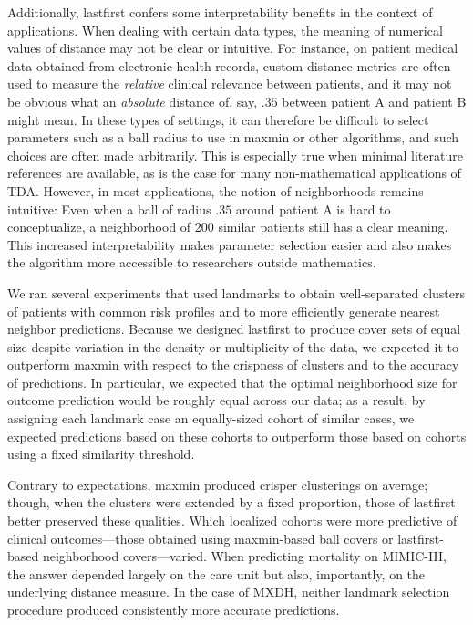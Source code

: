 \documentclass{article}
\begin{document}
Additionally, lastfirst confers some interpretability benefits in the
context of applications. When dealing with certain data types, the
meaning of numerical values of distance may not be clear or intuitive.
For instance, on patient medical data obtained from electronic health
records, custom distance metrics are often used to measure the
\emph{relative} clinical relevance between patients, and it may not be
obvious what an \emph{absolute} distance of, say, \(.35\) between
patient A and patient B might mean. In these types of settings, it can
therefore be difficult to select parameters such as a ball radius to use
in maxmin or other algorithms, and such choices are often made
arbitrarily. This is especially true when minimal literature references
are available, as is the case for many non-mathematical applications of
TDA. However, in most applications, the notion of neighborhoods remains
intuitive: Even when a ball of radius \(.35\) around patient A is hard
to conceptualize, a neighborhood of 200 similar patients still has a
clear meaning. This increased interpretability makes parameter selection
easier and also makes the algorithm more accessible to researchers
outside mathematics.

We ran several experiments that used landmarks to obtain well-separated
clusters of patients with common risk profiles and to more efficiently
generate nearest neighbor predictions. Because we designed lastfirst to
produce cover sets of equal size despite variation in the density or
multiplicity of the data, we expected it to outperform maxmin with
respect to the crispness of clusters and to the accuracy of predictions.
In particular, we expected that the optimal neighborhood size for
outcome prediction would be roughly equal across our data; as a result,
by assigning each landmark case an equally-sized cohort of similar
cases, we expected predictions based on these cohorts to outperform
those based on cohorts using a fixed similarity threshold.

Contrary to expectations, maxmin produced crisper clusterings on
average; though, when the clusters were extended by a fixed proportion,
those of lastfirst better preserved these qualities. Which localized
cohorts were more predictive of clinical outcomes---those obtained using
maxmin-based ball covers or lastfirst-based neighborhood
covers---varied. When predicting mortality on MIMIC-III, the answer
depended largely on the care unit but also, importantly, on the
underlying distance measure. In the case of MXDH, neither landmark
selection procedure produced consistently more accurate predictions.
\end{document}
